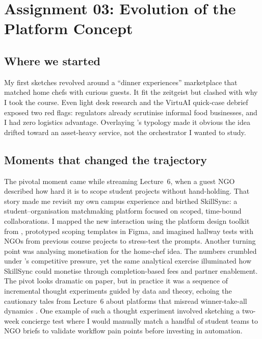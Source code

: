 \section*{Assignment 03: Evolution of the Platform Concept}

\subsection*{Where we started}
My first sketches revolved around a ``dinner experiences'' marketplace that matched home chefs with curious guests. It fit the zeitgeist but clashed with why I took the course. Even light desk research and the VirtuAI quick-case debrief \citep{Gunasilan2024} exposed two red flags: regulators already scrutinise informal food businesses, and I had zero logistics advantage. Overlaying \citet{Choudary2016}'s typology made it obvious the idea drifted toward an asset-heavy service, not the orchestrator I wanted to study.

\subsection*{Moments that changed the trajectory}
The pivotal moment came while streaming Lecture~6, when a guest NGO described how hard it is to scope student projects without hand-holding. That story made me revisit my own campus experience and birthed SkillSync: a student--organisation matchmaking platform focused on scoped, time-bound collaborations. I mapped the new interaction using the platform design toolkit from \citet{Reillier2017}, prototyped scoping templates in Figma, and imagined hallway tests with NGOs from previous course projects to stress-test the prompts. Another turning point was analysing monetisation for the home-chef idea. The numbers crumbled under \citet{Porter2008}'s competitive pressure, yet the same analytical exercise illuminated how SkillSync could monetise through completion-based fees and partner enablement. The pivot looks dramatic on paper, but in practice it was a sequence of incremental thought experiments guided by data and theory, echoing the cautionary tales from Lecture~6 about platforms that misread winner-take-all dynamics \citep{Lecture06}. One example of such a thought experiment involved sketching a two-week concierge test where I would manually match a handful of student teams to NGO briefs to validate workflow pain points before investing in automation.

